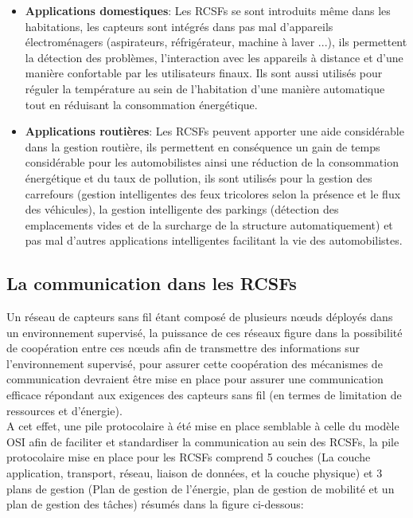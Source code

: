 \begin{itemize}
		\item \textbf{Applications domestiques}: Les RCSFs se sont introduits même dans les habitations, les capteurs sont intégrés dans pas mal d'appareils électroménagers (aspirateurs, réfrigérateur, machine à laver ...), ils permettent  la détection des problèmes, l'interaction avec les appareils à distance et d'une manière confortable par les utilisateurs finaux. Ils sont aussi utilisés pour réguler la température au sein de l'habitation d'une manière automatique tout en réduisant la consommation énergétique.\\
		
		\item \textbf{Applications routières}: Les RCSFs peuvent apporter une aide considérable dans la gestion routière, ils permettent en conséquence un gain de temps considérable pour les automobilistes ainsi une réduction de la consommation énergétique et du taux de pollution, ils sont utilisés pour la gestion des carrefours (gestion intelligentes des feux tricolores selon la présence et le flux des véhicules), la gestion intelligente des parkings (détection des emplacements vides et de la surcharge de la structure automatiquement) et pas mal d'autres applications intelligentes facilitant la vie des automobilistes.\\
				
\end{itemize}

\subsection{La communication dans les RCSFs}
Un réseau de capteurs sans fil étant composé de plusieurs nœuds déployés dans un environnement supervisé, la puissance de ces réseaux figure dans la possibilité de coopération entre ces nœuds afin de transmettre des informations sur l'environnement supervisé, pour assurer cette coopération des mécanismes de communication devraient être mise en place pour assurer une communication efficace répondant aux exigences des capteurs sans fil (en termes de limitation de ressources et d'énergie).\\
A cet effet, une pile protocolaire à été mise en place semblable à celle du modèle OSI afin de faciliter et standardiser la communication au sein des RCSFs, la pile protocolaire mise en place pour les RCSFs comprend 5 couches (La couche application, transport, réseau, liaison de données, et la couche physique) et 3 plans de gestion (Plan de gestion de l'énergie, plan de gestion de mobilité et un plan de gestion des tâches) résumés dans la figure ci-dessous:

